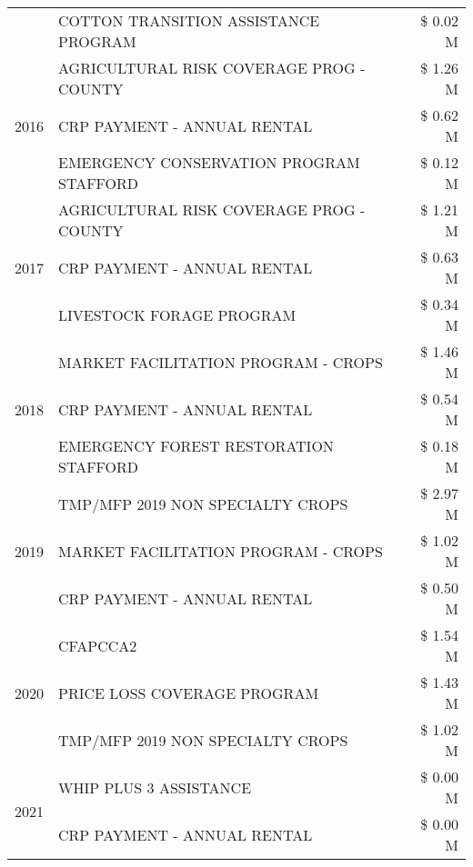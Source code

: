 \begin{tabular}{llr}
 & COTTON TRANSITION ASSISTANCE PROGRAM & \$ 0.02 M \\
\cline{1-3}
\multirow[t]{3}{*}{2016} & AGRICULTURAL RISK COVERAGE PROG - COUNTY & \$ 1.26 M \\
 & CRP PAYMENT - ANNUAL RENTAL & \$ 0.62 M \\
 & EMERGENCY CONSERVATION PROGRAM STAFFORD & \$ 0.12 M \\
\cline{1-3}
\multirow[t]{3}{*}{2017} & AGRICULTURAL RISK COVERAGE PROG - COUNTY & \$ 1.21 M \\
 & CRP PAYMENT - ANNUAL RENTAL & \$ 0.63 M \\
 & LIVESTOCK FORAGE PROGRAM & \$ 0.34 M \\
\cline{1-3}
\multirow[t]{3}{*}{2018} & MARKET FACILITATION PROGRAM - CROPS & \$ 1.46 M \\
 & CRP PAYMENT - ANNUAL RENTAL & \$ 0.54 M \\
 & EMERGENCY FOREST RESTORATION STAFFORD & \$ 0.18 M \\
\cline{1-3}
\multirow[t]{3}{*}{2019} & TMP/MFP 2019 NON SPECIALTY CROPS & \$ 2.97 M \\
 & MARKET FACILITATION PROGRAM - CROPS & \$ 1.02 M \\
 & CRP PAYMENT - ANNUAL RENTAL & \$ 0.50 M \\
\cline{1-3}
\multirow[t]{3}{*}{2020} & CFAPCCA2 & \$ 1.54 M \\
 & PRICE LOSS COVERAGE PROGRAM & \$ 1.43 M \\
 & TMP/MFP 2019 NON SPECIALTY CROPS & \$ 1.02 M \\
\cline{1-3}
\multirow[t]{2}{*}{2021} & WHIP PLUS 3 ASSISTANCE & \$ 0.00 M \\
 & CRP PAYMENT - ANNUAL RENTAL & \$ 0.00 M \\
\cline{1-3}
\bottomrule
\end{tabular}
